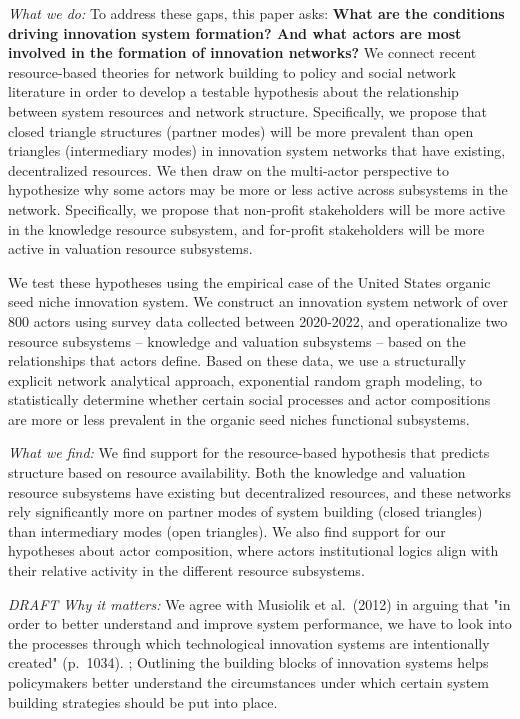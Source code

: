 \documentclass[twoside,12pt,final]{ucthesis-CA2012}
\begin{document}
\begin{ucmainmatter}
\emph{What we do:} To address these gaps, this paper asks: \textbf{What are the
conditions driving innovation system formation? And what actors are most
involved in the formation of innovation networks?} We connect recent
resource-based theories for network building to policy and social
network literature in order to develop a testable hypothesis about the
relationship between system resources and network structure.
Specifically, we propose that closed triangle structures (\textquotesingle partner
modes\textquotesingle) will be more prevalent than open triangles (\textquotesingle intermediary
modes\textquotesingle) in innovation system networks that have existing, decentralized
resources. We then draw on the multi-actor perspective to hypothesize
why some actors may be more or less active across subsystems in the
network. Specifically, we propose that non-profit stakeholders will be
more active in the knowledge resource subsystem, and for-profit
stakeholders will be more active in valuation resource subsystems.

We test these hypotheses using the empirical case of the United States
organic seed niche innovation system. We construct an innovation system
network of over 800 actors using survey data collected between
2020-2022, and operationalize two resource subsystems -- knowledge and
valuation subsystems -- based on the relationships that actors define.
Based on these data, we use a structurally explicit network analytical
approach, exponential random graph modeling, to statistically determine
whether certain social processes and actor compositions are more or less
prevalent in the organic seed niche\textquotesingle s functional subsystems.

\emph{What we find:} We find support for the resource-based hypothesis that
predicts structure based on resource availability. Both the knowledge
and valuation resource subsystems have existing but decentralized
resources, and these networks rely significantly more on \textquotesingle partner
modes\textquotesingle{} of system building (closed triangles) than intermediary modes
(open triangles). We also find support for our hypotheses about actor
composition, where actors\textquotesingle{} institutional logics align with their
relative activity in the different resource subsystems.

\emph{DRAFT Why it matters:} We agree with Musiolik et al.~(2012) in arguing
that "in order to better understand and improve system performance, we
have to look into the processes through which technological innovation
systems are intentionally created" (p.~1034). ; Outlining the building
blocks of innovation systems helps policymakers better understand the
circumstances under which certain system building strategies should be
put into place.


\end{ucmainmatter}
\end{document}
